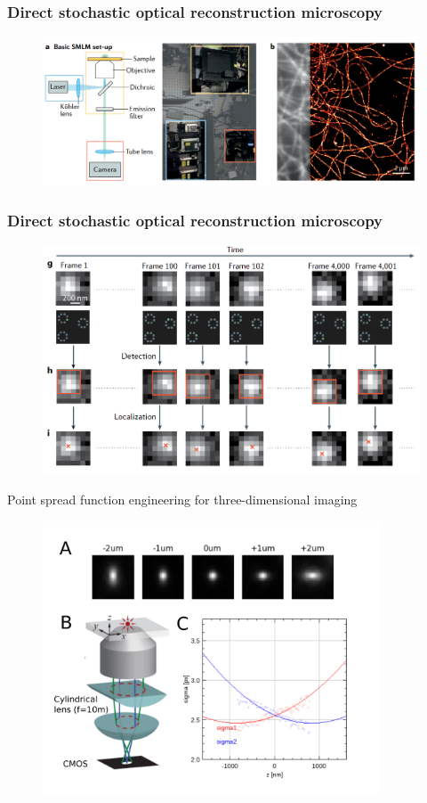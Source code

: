 \documentclass{beamer}					%
\begin{document}
\begin{frame}
\frametitle{Direct stochastic optical reconstruction microscopy}

\begin{figure}
\includegraphics[width=\textwidth]{Setup.png}
\end{figure}
  
\end{frame}

\begin{frame}
\frametitle{Direct stochastic optical reconstruction microscopy}

\begin{figure}
\includegraphics[width=13cm]{Localization.png}
\end{figure}
  
\end{frame}

\begin{frame}{Point spread function engineering for three-dimensional imaging}
\begin{figure}
\includegraphics[width=10cm]{Astigmatism.png}
\end{figure}
\end{frame}
\end{document}
